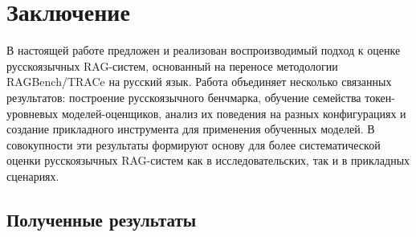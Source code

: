 \section{Заключение}
\label{sec:conclusion}

В настоящей работе предложен и реализован воспроизводимый подход к оценке
русскоязычных RAG-систем, основанный на переносе методологии RAGBench/TRACe на русский
язык. Работа объединяет несколько связанных результатов: построение русскоязычного
бенчмарка, обучение семейства токен-уровневых моделей-оценщиков, анализ их поведения на
разных конфигурациях и создание прикладного инструмента для применения обученных моделей.
В совокупности эти результаты формируют основу для более систематической оценки
русскоязычных RAG-систем как в исследовательских, так и в прикладных сценариях.

\subsection{Полученные результаты}

